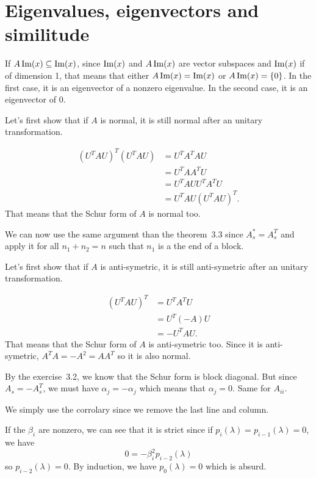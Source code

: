 \section{Eigenvalues, eigenvectors and similitude}
\begin{solution}
  If $A \operatorname{Im}(x) \subseteq \operatorname{Im}(x)$, since $\operatorname{Im}(x)$ and $A\operatorname{Im}(x)$
  are vector subspaces and $\operatorname{Im}(x)$ if of dimension 1,
  that means that either $A\operatorname{Im}(x) = \operatorname{Im}(x)$ or $A\operatorname{Im}(x) = \{0\}$.
  In the first case, it is an eigenvector of a nonzero eigenvalue.
  In the second case, it is an eigenvector of 0.
\end{solution}

\begin{solution}
  Let's first show that if $A$ is normal,
  it is still normal after an unitary transformation.

  \begin{align*}
    (U^TAU)^T(U^TAU)
    & = U^TA^TAU\\
    & = U^TAA^TU\\
    & = U^TAUU^TA^TU\\
    & = U^TAU(U^TAU)^T.
  \end{align*}
  That means that the Schur form of $A$ is normal too.

  We can now use the same argument than the theorem~3.3 since $A_s^* = A_s^T$
  and apply it for all $n_1+n_2 = n$ such that $n_1$ is a the end of a block.
\end{solution}

\begin{solution}
  Let's first show that if $A$ is anti-symetric,
  it is still anti-symetric after an unitary transformation.

  \begin{align*}
    (U^TAU)^T
    & = U^TA^TU\\
    & = U^T(-A)U\\
    & = -U^TAU.
  \end{align*}
  That means that the Schur form of $A$ is anti-symetric too.
  Since it is anti-symetric, $A^TA = -A^2 = AA^T$ so it is also normal.

  By the exercise~3.2, we know that the Schur form is block diagonal.
  But since $A_s = -A_s^T$,
  we must have $\alpha_j = -\alpha_j$ which means that $\alpha_j = 0$.
  Same for $A_{ii}$.
\end{solution}

\begin{solution}
  We simply use the corrolary since we remove the last line and column.

  If the $\beta_i$ are nonzero, we can see that it is strict since
  if $p_i(\lambda) = p_{i-1}(\lambda) = 0$, we have
  \[ 0 = -\beta_i^2 p_{i-2}(\lambda) \]
  so $p_{i-2}(\lambda) = 0$.
  By induction, we have $p_0(\lambda) = 0$ which is absurd.
\end{solution}

